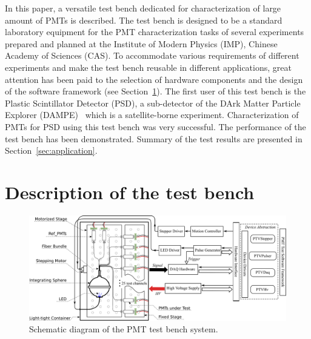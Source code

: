 \documentclass{nst}
\providecommand{\DIFadd}[1]{{\protect\color{yellow} #1}} %
\providecommand{\DIFaddbegin}{} %
\providecommand{\DIFaddend}{} %
\providecommand{\DIFdelbegin}{} %
\providecommand{\DIFdelend}{} %
\begin{document}
In this paper, a versatile test bench dedicated for \DIFdelbegin \DIFdelend \DIFaddbegin \DIFadd{characterization of large amount of PMTs is described}\DIFaddend .
The test bench is designed to be a standard laboratory equipment for the PMT characterization tasks of several experiments prepared and planned at the Institute of Modern Physics (IMP), Chinese Academy of Sciences (CAS).
To accommodate \DIFdelbegin \DIFdelend various requirements of different experiments and make the test bench reusable in different applications, \DIFdelbegin \DIFdelend \DIFaddbegin \DIFadd{great }\DIFaddend attention has been paid to the selection of  \DIFdelbegin \DIFdelend hardware components and the design of the software framework (see Section~\ref{sec:description}).
The first user of this test bench is the Plastic Scintillator Detector (PSD), a sub-detector of the DArk Matter Particle Explorer (DAMPE)~\cite{Chang_Jin_dampe} which is a satellite-borne experiment. 
\DIFdelbegin \DIFdelend \DIFaddbegin \DIFadd{Characterization of PMTs for }\DIFaddend PSD using this test bench \DIFdelbegin \DIFdelend \DIFaddbegin \DIFadd{was very successful. The }\DIFaddend performance of the test bench has been \DIFdelbegin \DIFdelend \DIFaddbegin \DIFadd{demonstrated}\DIFaddend .
Summary of the test results \DIFdelbegin \DIFdelend \DIFaddbegin \DIFadd{are }\DIFaddend presented in Section~\ref{sec:application}.

\section{Description of the test bench}
\label{sec:description}

\begin{figure}[!htb]
	\centering
	\includegraphics[width=150mm]{FIG1}
	\caption{Schematic diagram of the PMT test bench system.}
	\label{fig:FIG1}
\end{figure}
\end{document}
